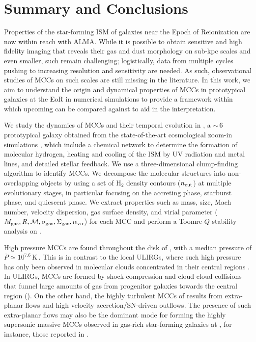 \IfFileExists{emulateapjlegacy.cls}{\documentclass[iop]{emulateapjlegacy}}{\documentclass[iop]{emulateapj}}
\newcommand{\AP}[1]{({\bf \color{apcolor} AP: #1})}
\begin{document}

\section{Summary and Conclusions}      \label{sec:conclusion}

Properties of the star-forming ISM of galaxies near the Epoch of Reionization are now within reach with ALMA. While it is possible to obtain sensitive and high fidelity imaging that reveals their gas and dust morphology on sub-kpc scales and even smaller, such \obs remain challenging; logistically, data from multiple cycles pushing to increasing resolution and sensitivity are needed. As such, observational studies of MCCs on such scales are still missing in the literature.
%
In this work, we aim to understand the origin and dynamical properties of MCCs in prototypical galaxies at the EoR in numerical simulations to provide a framework within which upcoming \obs can be compared against to aid in the interpretation.

We study the dynamics of MCCs and their temporal evolution in \flower, a \z$\sim$\,6 prototypical galaxy obtained from the state-of-the-art cosmological zoom-in simulations , which include a chemical network to determine the formation of molecular hydrogen, heating and cooling of the ISM by UV radiation and metal lines, and detailed stellar feedback.
%
We use a three-dimensional clump-finding algorithm to identify MCCs. We decompose the molecular structures into non-overlapping objects by using a set of H$_2$ density contours ($n_{\rm cut}$) at multiple evolutionary stages, in particular focusing on the accreting phase, starburst phase, and quiescent phase. We extract properties such as mass, size, Mach number, velocity dispersion, gas surface density, and virial parameter ($M_{\rm gas}, R, \mathcal{M}, \sigma_{\rm gas}, \Sigma_{\rm gas}, \alpha_{\rm vir}$) for each MCC and perform a Toomre-$Q$ stability analysis on \flower.

High pressure MCCs are found throughout the disk of \flower, with a median pressure of $\bar{P}\simeq10^{7.6}$\,K\,\cc.
This is in contrast to the local ULIRGs, where such high pressure has only been observed in molecular clouds concentrated in their
central regions \citep{Downes98a, Sakamoto08a}. In ULIRGs, MCCs are formed by shock compression and cloud-cloud collisions that 
funnel large amounts of gas from progenitor galaxies towards the central region (\citealt{Tan00a, Wu18a}). On the other hand, 
the highly turbulent MCCs of \flower results from extra-planar flows and high velocity accretion/SN-driven outflows. 
The presence of such extra-planar flows may also be the dominant mode for forming the highly supersonic massive 
MCCs observed in gas-rich star-forming galaxies at \z{}, for instance, those reported in \citet{Swinbank11a}.
\end{document}
